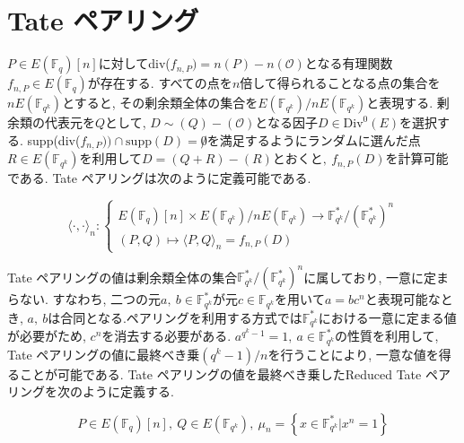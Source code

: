 \section{Tate ペアリング}
\par
$P \in E(\mathbb{F}_q)[n]$に対してdiv($f_{n, P})=n(P)-n(\mathcal{O})$となる有理関数$f_{n,P} \in E(\mathbb{F}_q)$が存在する. すべての点を$n$倍して得られることなる点の集合を$nE(\mathbb{F}_{q^k})$とすると, その剰余類全体の集合を$E(\mathbb{F}_{q^k})/nE(\mathbb{F}_{q^k})$と表現する. 剰余類の代表元を$Q$として, $D \sim (Q) - (\mathcal{O})$となる因子$D \in \mbox{Div}^0(E)$を選択する. supp(div($f_{n, P})) \cap \mbox{supp} (D) = \not 0$を満足するようにランダムに選んだ点$R \in E(\mathbb{F}_{q^k})$を利用して$D=(Q + R) - (R)とおくと,\ f_{n,P}(D)$を計算可能である. Tate ペアリングは次のように定義可能である.
\par
\[
\langle \cdot,\cdot\rangle_n:
\left\{
\begin{array}{l}
E(\mathbb{F}_q)[n] \times E(\mathbb{F}_{q^k})/nE(\mathbb{F}_{q^k}) \to \mathbb{F}_{q^k}^\ast /(\mathbb{F}_{q^k}^\ast)^n\\
(P,Q) \mapsto \langle P, Q \rangle _n = f_{n,P}(D)
\end{array}
\right.
\]
\par
Tate ペアリングの値は剰余類全体の集合$\mathbb{F}_{q^k}^\ast/(\mathbb{F}_{q^k}^\ast)^n$に属しており, 一意に定まらない. すなわち, 二つの元$a,\ b \in \mathbb{F}_{q^k}^\ast が元c \in \mathbb{F}_{q^k}を用いてa = bc^n$と表現可能なとき, $a,\ b$は合同となる.ペアリングを利用する方式では$\mathbb{F}_{q^k}^\ast$における一意に定まる値が必要がため, $c^n$を消去する必要がある. $a^{q^k - 1} = 1,\ a \in \mathbb{F}_{q^k}^\ast$の性質を利用して, Tate ペアリングの値に最終べき乗$(q^k - 1) / n$を行うことにより, 一意な値を得ることが可能である. Tate ペアリングの値を最終べき乗したReduced Tate ペアリングを次のように定義する.
\par
\[
P \in E(\mathbb{F}_q)[n],\ Q \in E(\mathbb{F}_{q^k}),\ \mu_n = \left\{ x \in \mathbb{F}_{q^k}^\ast | x^n = 1 \right\}
\]

